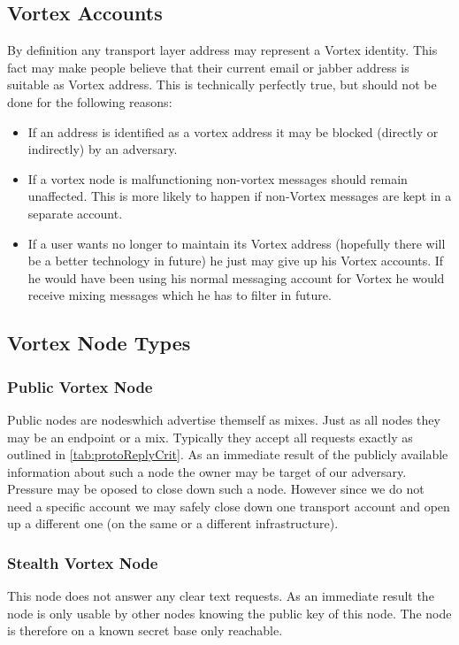 \subsection{Vortex Accounts}
By definition any transport layer address may represent a Vortex identity. This fact may make people believe that their current email or jabber address is suitable as Vortex address. This is technically perfectly true, but should not be done for the following reasons:

\begin{itemize}
	\item If an address is identified as a vortex address it may be blocked (directly or indirectly) by an adversary.
	\item If a vortex node is malfunctioning non-vortex messages should remain unaffected. This is more likely to happen if non-Vortex messages are kept in a separate account.
	\item If a user wants no longer to maintain its Vortex address (hopefully there will be a better technology in future) he just may give up his Vortex accounts. If he would have been using his normal messaging account for Vortex he would receive mixing messages which he has to filter in future.
\end{itemize}

\subsection{Vortex Node Types}

\subsubsection{Public Vortex Node}
Public nodes are nodeswhich advertise themself as mixes. Just as all nodes they may be an endpoint or a mix. Typically they accept all requests exactly as outlined in \ref{tab:protoReplyCrit}. As an immediate result of the publicly available information about such a node the owner may be target of our adversary. Pressure may be oposed to close down such a node. However since we do not need a specific account we may safely close down one transport account and open up a different one (on the same or a different infrastructure).

\subsubsection{Stealth Vortex Node\label{sec:stealthNode}}
This node does not answer any clear text requests. As an immediate result the node is only usable by other nodes knowing the public key of this node. The node is therefore on a known secret base only reachable.

